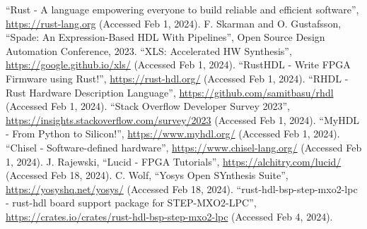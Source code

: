 \documentclass[sigplan,screen,sigconf]{acmart}
\begin{document}
\begin{thebibliography}{00}
   ``Rust - A language empowering everyone to build reliable and efficient software'', \url{https://rust-lang.org} (Accessed Feb 1, 2024).
   F. Skarman and O. Gustafsson, ``Spade: An Expression-Based HDL With Pipelines'', Open Source Design Automation Conference, 2023.
   ``XLS: Accelerated HW Synthesis'', \url{https://google.github.io/xls/} (Accessed Feb 1, 2024).
   ``RustHDL - Write FPGA Firmware using Rust!'', \url{https://rust-hdl.org/} (Accessed Feb 1, 2024).
   ``RHDL - Rust Hardware Description Language'', \url{https://github.com/samitbasu/rhdl} (Accessed Feb 1, 2024).
   ``Stack Overflow Developer Survey 2023'', \url{https://insights.stackoverflow.com/survey/2023} (Accessed Feb 1, 2024).
   ``MyHDL - From Python to Silicon!'', \url{https://www.myhdl.org/} (Accessed Feb 1, 2024).
   ``Chisel - Software-defined hardware'', \url{https://www.chisel-lang.org/} (Accessed Feb 1, 2024).
   J. Rajewski, ``Lucid - FPGA Tutorials'', \url{https://alchitry.com/lucid/} (Accessed Feb 18, 2024).
   C. Wolf, ``Yosys Open SYnthesis Suite'', \url{https://yosyshq.net/yosys/} (Accessed Feb 18, 2024).
   ``rust-hdl-bsp-step-mxo2-lpc - rust-hdl board support package for STEP-MXO2-LPC'', \url{https://crates.io/crates/rust-hdl-bsp-step-mxo2-lpc} (Accessed Feb 4, 2024).
\end{thebibliography}
\end{document}
